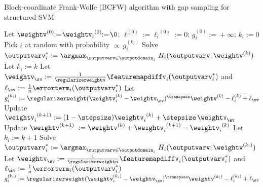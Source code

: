 \documentclass{article}
\begin{document}
\begin{algorithm}[t]
    \caption{Block-coordinate Frank-Wolfe (BCFW) algorithm with gap sampling for structured SVM}%
    \label{alg:FW_product_SVM_gapsampling}
\begin{algorithmic}[1]
        \STATE Let $\weightv^{(0)}\!\!:=\!{\weightv_i}^{(0)}\!\!:=\!\0$; \: $\ell^{(0)}\!\!:=\!{\ell_i}^{(0)}\!\!:=\!0$; \: $g_i^{(0)}\!\!:=\!+\infty$;
        \STATE $k_i\!:=\!0$
                \STATE Pick $i$ at random with probability $\propto~g_i^{(k_i)}$
                \STATE Solve $\outputvarv_i^* := \displaystyle\argmax_{\outputvarv\in\outputdomain_i} \ H_i(\outputvarv;\weightv^{(k)})$  \label{alg:FW_product_SVM_gap_sampling:max_oracle} %
                \STATE Let $k_i := k$
                \STATE Let $\weightv_{\sv} := \frac1{\regularizerweight n} \featuremapdiffv_i(\outputvarv_i^*)$ \;
                and \; $\ell_{\sv} := \frac1n \errorterm_i(\outputvarv_i^*)$
               \STATE Let $g_i^{(k_i)} :=  \regularizerweight (\weightv_i^{(k)}-\weightv_{\sv})^\transpose \weightv^{(k)} - \ell_i^{(k)} + \ell_{\sv}$\label{alg:FW_product_SVM_gap_sampling:block_gap}
               \label{alg:FW_product_SVM_gap_sampling:line_search}
                \STATE Update ${\weightv_i}^{(k+1)}:= (1-\stepsize){\weightv_i}^{(k)}+\stepsize \,\weightv_{\sv}$
                \STATE Update $\weightv^{(k+1)}\;:= \weightv^{(k)} + {\weightv_i}^{(k+1)} - {\weightv_i}^{(k)}$
                    \STATE Let $k_i:= k+1$
                    \STATE Solve $\outputvarv_i^* := \displaystyle\argmax_{\outputvarv\in\outputdomain_i} \ H_i(\outputvarv;\weightv^{(k_i)})$ 
                    \STATE Let $\weightv_{\sv} := \frac1{\regularizerweight n} \featuremapdiffv_i(\outputvarv_i^*)$ \; 
                 and \; $\ell_{\sv} := \frac1n \errorterm_i(\outputvarv_i^*)$
                    \STATE $g_i^{(k_i)} := \regularizerweight (\weightv_i^{(k_i)}-\weightv_{\sv})^\transpose \weightv^{(k_i)} - \ell_i^{(k_i)} + \ell_{\sv}$
                \ENDFOR
              \ENDIF
        \ENDFOR
%
%
\end{algorithmic}
\end{algorithm}
\end{document}
